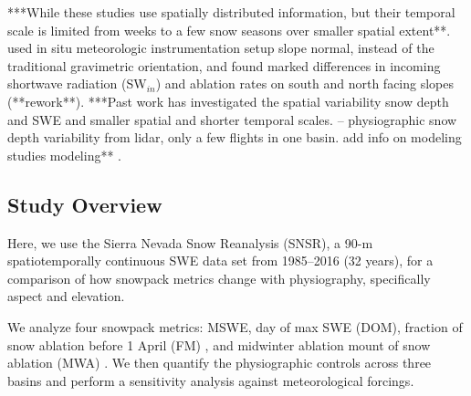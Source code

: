 ***While these studies use spatially distributed information, but their temporal scale is limited from weeks to a few snow seasons over smaller spatial extent**. \cite{pomeroyVariationSurfaceEnergetics2003} used in situ meteorologic instrumentation setup slope normal, instead of the traditional gravimetric orientation, and found marked differences in incoming shortwave radiation (SW$_{in}$) and ablation rates on south and north facing slopes (**rework**). %
***Past work has investigated the spatial variability snow depth and SWE and smaller spatial and shorter temporal scales.
-- \citep{kirchnerLiDARMeasurementSeasonal2014, tennantRegionalSensitivitiesSeasonal2017} physiographic snow depth variability from lidar, only a few flights in one basin. add info on modeling studies %
modeling** \citep{mazzottiCanopyStructureTopography2023, lopez-morenoEffectSlopeAspect2014}. 

\subsection{Study Overview}
Here, we use the Sierra Nevada Snow Reanalysis (SNSR), a 90-m spatiotemporally continuous SWE data set from 1985--2016 (32 years), for a comparison of how snowpack metrics change with physiography, specifically aspect and elevation.

We analyze four snowpack metrics: MSWE, day of max SWE (DOM), fraction of snow ablation before 1 April (FM) \citep{musselmanWinterMeltTrends2021}, and midwinter ablation mount of snow ablation (MWA) \citep{harpoldHumidityDeterminesSnowpack2018}. We then quantify the physiographic controls across three basins and perform a sensitivity analysis against meteorological forcings.





